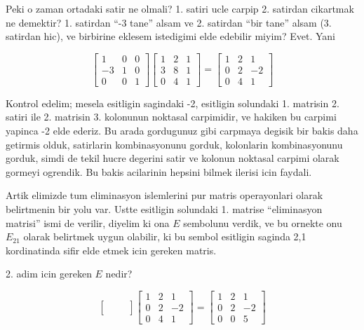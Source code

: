 \documentclass[12pt,fleqn]{article}\usepackage{../common}
\begin{document}
Peki o zaman ortadaki satir ne olmali? 1. satiri ucle carpip 2. satirdan
cikartmak ne demektir? 1. satirdan ``-3 tane'' alsam ve 2. satirdan ``bir
tane'' alsam (3. satirdan hic), ve birbirine eklesem istedigimi elde
edebilir miyim? Evet. Yani 

$$ 
\left[\begin{array}{rrr}
1 & 0 & 0 \\
-3 & 1 & 0 \\
0 & 0 & 1
\end{array}\right]
\left[\begin{array}{rrr}
1 & 2 & 1 \\
3 & 8 & 1 \\
0 & 4 & 1
\end{array}\right] =
\left[\begin{array}{rrr}
    1 & 2 & 1 \\
    0 & 2 & -2 \\
    0 & 4 & 1
  \end{array}\right]
 $$

Kontrol edelim; mesela esitligin sagindaki -2, esitligin solundaki
1. matrisin 2. satiri ile 2. matrisin 3. kolonunun noktasal carpimidir, ve
hakiken bu carpimi yapinca -2 elde ederiz. Bu arada gordugunuz gibi
carpmaya degisik bir bakis daha getirmis olduk, satirlarin kombinasyonunu
gorduk, kolonlarin kombinasyonunu gorduk, simdi de tekil hucre degerini 
satir ve kolonun noktasal carpimi olarak gormeyi ogrendik. Bu bakis
acilarinin hepsini bilmek ilerisi icin faydali.

Artik elimizde tum eliminasyon islemlerini pur matris operayonlari olarak
belirtmenin bir yolu var. Ustte esitligin solundaki 1. matrise
``eliminasyon matrisi'' ismi de verilir, diyelim ki ona $E$ sembolunu
verdik, ve bu ornekte onu $E_{21}$ olarak belirtmek uygun olabilir, ki bu
sembol esitligin saginda 2,1 kordinatinda sifir elde etmek icin gereken
matris. 

2. adim icin gereken $E$ nedir? 

$$ 
\left[\begin{array}{rrr}
 &  &  \\
 &  &  \\
 &  & 
\end{array}\right]
\left[\begin{array}{rrr}
  1 & 2 & 1 \\
  0 & 2 & -2 \\
  0 & 4 & 1
\end{array}\right] 
=
\left[\begin{array}{rrr}
1 & 2 & 1 \\
0 & 2 & -2 \\
0 & 0 & 5
\end{array}\right]
 $$
\end{document}
